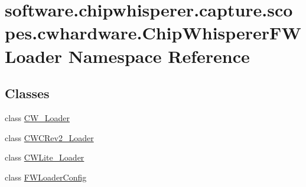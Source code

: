 \hypertarget{namespacesoftware_1_1chipwhisperer_1_1capture_1_1scopes_1_1cwhardware_1_1ChipWhispererFWLoader}{}\section{software.\+chipwhisperer.\+capture.\+scopes.\+cwhardware.\+Chip\+Whisperer\+F\+W\+Loader Namespace Reference}
\label{namespacesoftware_1_1chipwhisperer_1_1capture_1_1scopes_1_1cwhardware_1_1ChipWhispererFWLoader}
\subsection*{Classes}
\begin{DoxyCompactItemize}
\item 
class \hyperlink{classsoftware_1_1chipwhisperer_1_1capture_1_1scopes_1_1cwhardware_1_1ChipWhispererFWLoader_1_1CW__Loader}{C\+W\+\_\+\+Loader}
\item 
class \hyperlink{classsoftware_1_1chipwhisperer_1_1capture_1_1scopes_1_1cwhardware_1_1ChipWhispererFWLoader_1_1CWCRev2__Loader}{C\+W\+C\+Rev2\+\_\+\+Loader}
\item 
class \hyperlink{classsoftware_1_1chipwhisperer_1_1capture_1_1scopes_1_1cwhardware_1_1ChipWhispererFWLoader_1_1CWLite__Loader}{C\+W\+Lite\+\_\+\+Loader}
\item 
class \hyperlink{classsoftware_1_1chipwhisperer_1_1capture_1_1scopes_1_1cwhardware_1_1ChipWhispererFWLoader_1_1FWLoaderConfig}{F\+W\+Loader\+Config}
\end{DoxyCompactItemize}
